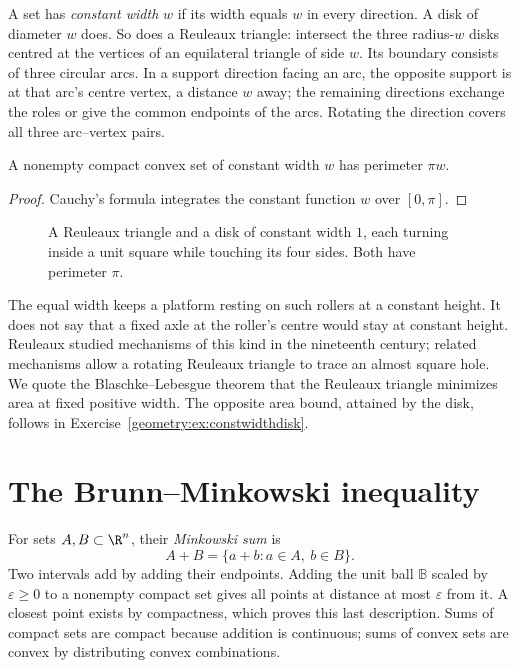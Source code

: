 A set has \emph{constant width} $w$ if its width equals $w$ in every direction. A disk of diameter $w$ does. So does a Reuleaux triangle: intersect the three radius-$w$ disks centred at the vertices of an equilateral triangle of side $w$. Its boundary consists of three circular arcs. In a support direction facing an arc, the opposite support is at that arc's centre vertex, a distance $w$ away; the remaining directions exchange the roles or give the common endpoints of the arcs. Rotating the direction covers all three arc--vertex pairs.

\begin{corollary}[Barbier, 1860]\label{geometry:cor:barbier}
A nonempty compact convex set of constant width $w$ has perimeter $\pi w$.
\end{corollary}

\begin{proof}
Cauchy's formula integrates the constant function $w$ over $[0,\pi]$.
\end{proof}

\begin{figure}[ht]
\centering
{}
\caption{A Reuleaux triangle and a disk of constant width $1$, each turning inside a unit square while touching its four sides. Both have perimeter $\pi$.}
\label{geometry:fig:reuleaux}
\end{figure}

The equal width keeps a platform resting on such rollers at a constant height. It does not say that a fixed axle at the roller's centre would stay at constant height. Reuleaux studied mechanisms of this kind in the nineteenth century; related mechanisms allow a rotating Reuleaux triangle to trace an almost square hole. We quote the Blaschke--Lebesgue theorem that the Reuleaux triangle minimizes area at fixed positive width. The opposite area bound, attained by the disk, follows in Exercise~\ref{geometry:ex:constwidthdisk}.

\section{The Brunn--Minkowski inequality}

For sets $A,B\subset\R^n$, their \emph{Minkowski sum} is
\[
A+B=\{a+b:a\in A,\ b\in B\}.
\]
Two intervals add by adding their endpoints. Adding the unit ball $\mathbb B$ scaled by $\varepsilon\ge0$ to a nonempty compact set gives all points at distance at most $\varepsilon$ from it. A closest point exists by compactness, which proves this last description. Sums of compact sets are compact because addition is continuous; sums of convex sets are convex by distributing convex combinations.

